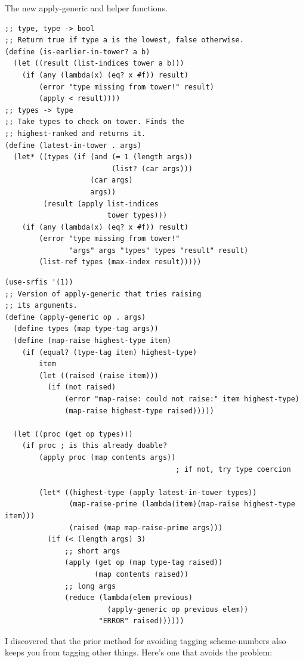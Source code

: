 \documentclass[final,fleqn,titlepage,twoside]{article}
\begin{document}
The new apply-generic and helper functions.
\begin{verbatim}
;; type, type -> bool
;; Return true if type a is the lowest, false otherwise.
(define (is-earlier-in-tower? a b)
  (let ((result (list-indices tower a b)))
    (if (any (lambda(x) (eq? x #f)) result)
        (error "type missing from tower!" result)
        (apply < result))))
;; types -> type
;; Take types to check on tower. Finds the
;; highest-ranked and returns it.
(define (latest-in-tower . args)
  (let* ((types (if (and (= 1 (length args))
                         (list? (car args)))
                    (car args)
                    args))
         (result (apply list-indices
                        tower types)))
    (if (any (lambda(x) (eq? x #f)) result)
        (error "type missing from tower!"
               "args" args "types" types "result" result)
        (list-ref types (max-index result)))))
\end{verbatim}
\begin{verbatim}
(use-srfis '(1))
;; Version of apply-generic that tries raising
;; its arguments.
(define (apply-generic op . args)
  (define types (map type-tag args))
  (define (map-raise highest-type item)
    (if (equal? (type-tag item) highest-type)
        item
        (let ((raised (raise item)))
          (if (not raised)
              (error "map-raise: could not raise:" item highest-type)
              (map-raise highest-type raised)))))
  
  (let ((proc (get op types)))
    (if proc ; is this already doable?
        (apply proc (map contents args))
                                        ; if not, try type coercion
  
        (let* ((highest-type (apply latest-in-tower types))
               (map-raise-prime (lambda(item)(map-raise highest-type item)))
               (raised (map map-raise-prime args)))
          (if (< (length args) 3)
              ;; short args
              (apply (get op (map type-tag raised))
                     (map contents raised))
              ;; long args
              (reduce (lambda(elem previous)
                        (apply-generic op previous elem))
                      "ERROR" raised))))))
\end{verbatim}

I discovered that the prior method for avoiding tagging scheme-numbers also keeps you from tagging other things. Here's one that avoids the problem:
\end{document}
